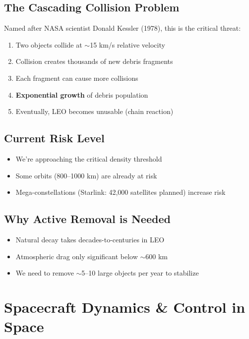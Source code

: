 \documentclass[11pt,a4paper]{article}
\begin{document}
\subsection{The Cascading Collision Problem}

Named after NASA scientist Donald Kessler (1978), this is the critical threat:

\begin{enumerate}
    \item Two objects collide at $\sim$15 km/s relative velocity
    \item Collision creates thousands of new debris fragments
    \item Each fragment can cause more collisions
    \item \textbf{Exponential growth} of debris population
    \item Eventually, LEO becomes unusable (chain reaction)
\end{enumerate}

\subsection{Current Risk Level}

\begin{itemize}[leftmargin=*]
    \item We're approaching the critical density threshold
    \item Some orbits (800--1000 km) are already at risk
    \item Mega-constellations (Starlink: 42,000 satellites planned) increase risk
\end{itemize}

\subsection{Why Active Removal is Needed}

\begin{itemize}[leftmargin=*]
    \item Natural decay takes decades-to-centuries in LEO
    \item Atmospheric drag only significant below $\sim$600 km
    \item We need to remove $\sim$5--10 large objects per year to stabilize
\end{itemize}

\section{Spacecraft Dynamics \& Control in Space}
\end{document}
